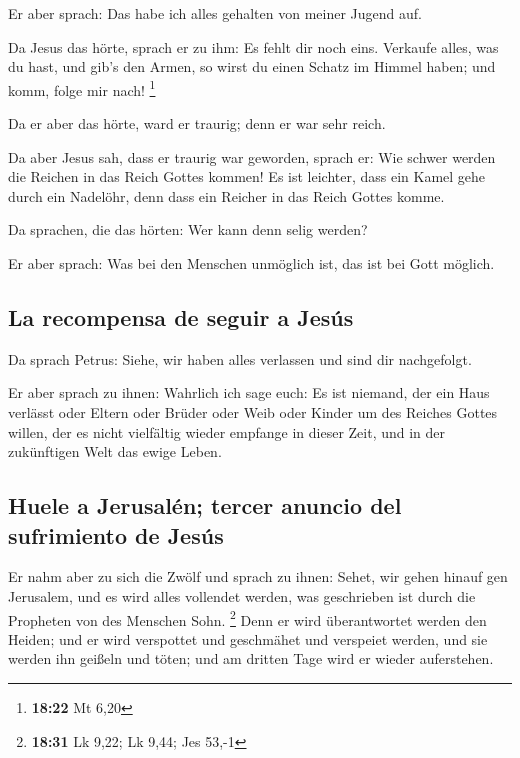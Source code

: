 Er aber sprach: Das habe ich alles gehalten von meiner
Jugend auf.

 Da Jesus das hörte, sprach er zu ihm: Es fehlt dir noch
eins. Verkaufe alles, was du hast, und gib's den Armen, so wirst du
einen Schatz im Himmel haben; und komm, folge mir nach! \footnote{\textbf{18:22}
  Mt 6,20}

 Da er aber das hörte, ward er traurig; denn er war sehr
reich.

 Da aber Jesus sah, dass er traurig war geworden, sprach
er: Wie schwer werden die Reichen in das Reich Gottes kommen!
 Es ist leichter, dass ein Kamel gehe durch ein Nadelöhr,
denn dass ein Reicher in das Reich Gottes komme.

 Da sprachen, die das hörten: Wer kann denn selig werden?

 Er aber sprach: Was bei den Menschen unmöglich ist, das
ist bei Gott möglich.

\hypertarget{la-recompensa-de-seguir-a-jesuxfas}{%
\subsection{La recompensa de seguir a
Jesús}\label{la-recompensa-de-seguir-a-jesuxfas}}

 Da sprach Petrus: Siehe, wir haben alles verlassen und
sind dir nachgefolgt.

 Er aber sprach zu ihnen: Wahrlich ich sage euch: Es ist
niemand, der ein Haus verlässt oder Eltern oder Brüder oder Weib oder
Kinder um des Reiches Gottes willen,  der es nicht
vielfältig wieder empfange in dieser Zeit, und in der zukünftigen Welt
das ewige Leben.

\hypertarget{huele-a-jerusaluxe9n-tercer-anuncio-del-sufrimiento-de-jesuxfas}{%
\subsection{Huele a Jerusalén; tercer anuncio del sufrimiento de
Jesús}\label{huele-a-jerusaluxe9n-tercer-anuncio-del-sufrimiento-de-jesuxfas}}

 Er nahm aber zu sich die Zwölf und sprach zu ihnen:
Sehet, wir gehen hinauf gen Jerusalem, und es wird alles vollendet
werden, was geschrieben ist durch die Propheten von des Menschen Sohn.
\footnote{\textbf{18:31} Lk 9,22; Lk 9,44; Jes 53,-1} 
Denn er wird überantwortet werden den Heiden; und er wird verspottet und
geschmähet und verspeiet werden,  und sie werden ihn
geißeln und töten; und am dritten Tage wird er wieder auferstehen.

